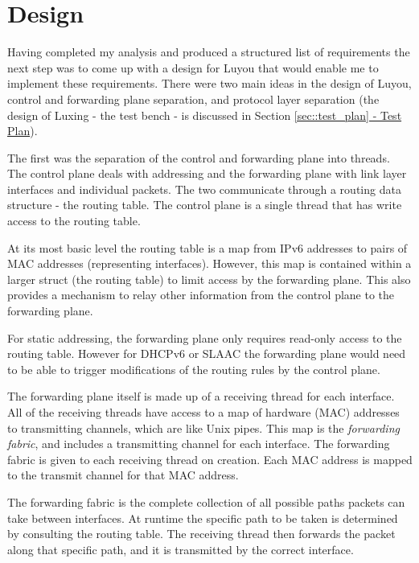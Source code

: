\documentclass[12pt,a4paper,twoside,openany]{report}
\begin{document}
\section{Design}
\label{sec::design}

Having completed my analysis and produced a structured list of requirements the next step was to come up with a design for Luyou that would enable me to implement these requirements.  There were two main ideas in the design of Luyou, control and forwarding plane separation, and protocol layer separation (the design of Luxing - the test bench - is discussed in Section \ref{sec::test_plan}\hyperref[sec::test_plan]{ - Test Plan}). 

\bigskip

The first was the separation of the control and forwarding plane into threads. The control plane deals with addressing and the forwarding plane with link layer interfaces and individual packets.  The two communicate through a routing data structure - the routing table.  The control plane is a single thread that has write access to the routing table.

At its most basic level the routing table is a map from IPv6 addresses to pairs of MAC addresses (representing interfaces). However, this map is contained within a larger struct (the routing table) to limit access by the forwarding plane. This also provides a mechanism to relay other information from the control plane to the forwarding plane.

For static addressing, the forwarding plane only requires read-only access to the routing table. However for DHCPv6 or SLAAC the forwarding plane would need to be able to trigger modifications of the routing rules by the control plane. 

The forwarding plane itself is made up of a receiving thread for each interface. All of the receiving threads have access to a map of hardware (MAC) addresses to transmitting channels, which are like Unix pipes. This map is the \textit{forwarding fabric}, and includes a transmitting channel for each interface. The forwarding fabric is given to each receiving thread on creation.  Each MAC address is mapped to the transmit channel for that MAC address.

The forwarding fabric is the complete collection of all possible paths packets can take between interfaces.  At runtime the specific path to be taken is determined by consulting the routing table. The receiving thread then forwards the packet along that specific path, and it is transmitted by the correct interface.
\end{document}
